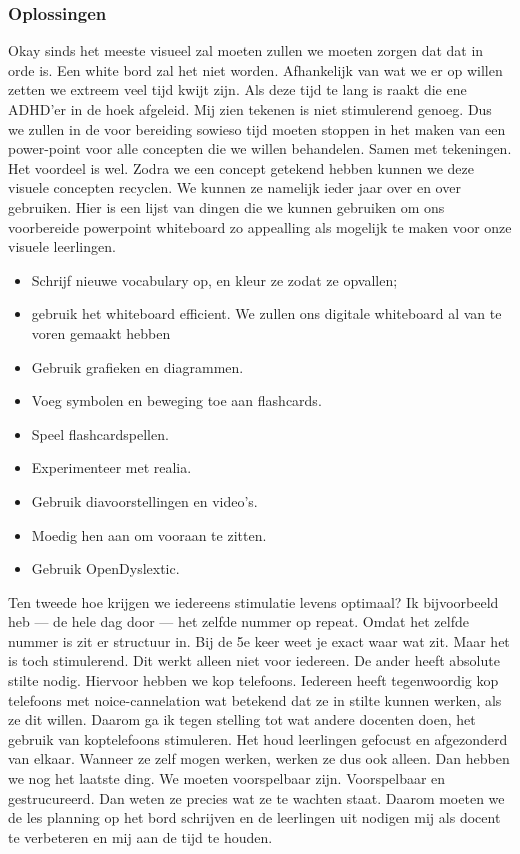 \documentclass{article}
\begin{document}
        \subsubsection{Oplossingen}
            Okay sinds het meeste visueel zal moeten zullen we moeten zorgen dat dat in orde is. Een white bord zal het niet worden. Afhankelijk van wat we er op willen zetten we extreem veel tijd kwijt zijn. Als deze tijd te lang is raakt die ene ADHD'er in de hoek afgeleid. Mij zien tekenen is niet stimulerend genoeg. Dus we zullen in de voor bereiding sowieso tijd moeten stoppen in het maken van een power-point voor alle concepten die we willen behandelen. Samen met tekeningen. Het voordeel is wel. Zodra we een concept getekend hebben kunnen we deze visuele concepten recyclen. We kunnen ze namelijk ieder jaar over en over gebruiken. 
            \bigskip
            \noindent Hier is een lijst van dingen die we kunnen gebruiken om ons voorbereide powerpoint whiteboard zo appealling als mogelijk te maken voor onze visuele leerlingen.
            \begin{itemize}
                \setlength\itemsep{0em}
                \item Schrijf nieuwe vocabulary op, en kleur ze zodat ze opvallen;
                \item gebruik het whiteboard efficient. We zullen ons digitale whiteboard al van te voren gemaakt hebben
                \item Gebruik grafieken en diagrammen.
                \item Voeg symbolen en beweging toe aan flashcards.
                \item Speel flashcardspellen.
                \item Experimenteer met realia.
                \item Gebruik diavoorstellingen en video's.
                \item Moedig hen aan om vooraan te zitten.
                \item Gebruik OpenDyslextic.
            \end{itemize}
            \bigskip
            \noindent Ten tweede hoe krijgen we iedereens stimulatie levens optimaal? Ik bijvoorbeeld heb — de hele dag door — het zelfde nummer op repeat. Omdat het zelfde nummer is zit er structuur in. Bij de 5e keer weet je exact waar wat zit. Maar het is toch stimulerend. Dit werkt alleen niet voor iedereen. De ander heeft absolute stilte nodig.
            \bigskip
            \noindent Hiervoor hebben we kop telefoons. Iedereen heeft tegenwoordig kop telefoons met noice-cannelation wat betekend dat ze in stilte kunnen werken, als ze dit willen. Daarom ga ik tegen stelling tot wat andere docenten doen, het gebruik van koptelefoons stimuleren. Het houd leerlingen gefocust en afgezonderd van elkaar. Wanneer ze zelf mogen werken, werken ze dus ook alleen.
            \bigskip
            \noindent Dan hebben we nog het laatste ding. We moeten voorspelbaar zijn. Voorspelbaar en gestrucureerd. Dan weten ze precies wat ze te wachten staat. Daarom moeten we de les planning op het bord schrijven en de leerlingen uit nodigen mij als docent te verbeteren en mij aan de tijd te houden. 
        
\end{document}
